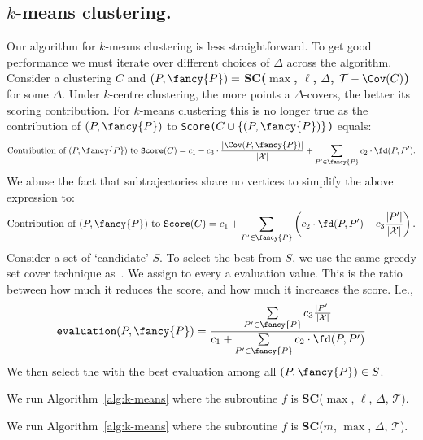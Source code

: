 \subsection{\texorpdfstring{$k$-means clustering.}{k-means clustering} }
%
Our algorithm for $k$-means clustering is less straightforward. 
To get good performance we must iterate over different choices of $\Delta$ across the algorithm. Consider a clustering $C$ and $(P, {\fancy{P}})=$ \textbf{SC($\max$, $\ell$, $\Delta$, $\mathcal{T} - \Cov(C)$)} for some $\Delta$. 
Under $k$-centre clustering, the more points a $\Delta$-\pathlet covers, the better its scoring contribution. 
For $k$-means clustering this is no longer true as the contribution of $(P, {\fancy{P}})$ to \texttt{Score($C \cup \{ (P, {\fancy{P}})\}$)} equals:
%
\[
\textnormal{Contribution of } (P, {\fancy{P}}) \textnormal{ to } \texttt{Score}(C) = c_1 - c_3 \cdot \frac{|\Cov(P, {\fancy{P}})|}{|\mathcal{X}|} + \sum_{P' \in {\fancy{P}}} c_2 \cdot \fd(P, P').
\]
%
\noindent
%
\noindent
We abuse the fact that subtrajectories share no vertices to simplify the above expression to:
%
\[
\textnormal{Contribution of } (P, {\fancy{P}}) \textnormal{ to } \texttt{Score}(C) =  
c_1 + \sum_{P' \in {\fancy{P}}} \left( c_2 \cdot \fd(P, P') - c_3  \frac{|P'|}{|\mathcal{X}|} \right).
\]
%
%
\noindent
Consider a set of `candidate' \pathlets $S$.
To select the best \pathlet from $S$, we use the same greedy set cover technique as~\cite{agarwal2018subtrajectory}. We assign to every \pathlet a evaluation value. This is the ratio between how much it reduces the score, and how much it increases the score. 
I.e.,
\[
\texttt{evaluation}(P, {\fancy{P}}) = \frac{\sum\limits_{P' \in {\fancy{P}}  } c_3 \frac{|P'|}{|\mathcal{X}| } }{c_1 + \sum\limits_{P' \in {\fancy{P}}} c_2 \cdot \fd(P, P')}
\]
%
\noindent
We then select the \pathlet with the best evaluation among all $(P, {\fancy{P}}) \in S$. 
\noindent
%
%
\begin{algodef}
    \label{algodef:k-means-length}
    We run Algorithm~\ref{alg:k-means} where the subroutine $f$ is \textbf{SC}($\max$, $\ell$, $\Delta$, $\mathcal{T}$). 
\end{algodef}
%
%
\begin{algodef}
    \label{algodef:k-means-size}
     We run Algorithm~\ref{alg:k-means} where the subroutine $f$ is \textbf{SC}($m$, $\max$, $\Delta$, $\mathcal{T}$). 
\end{algodef}
